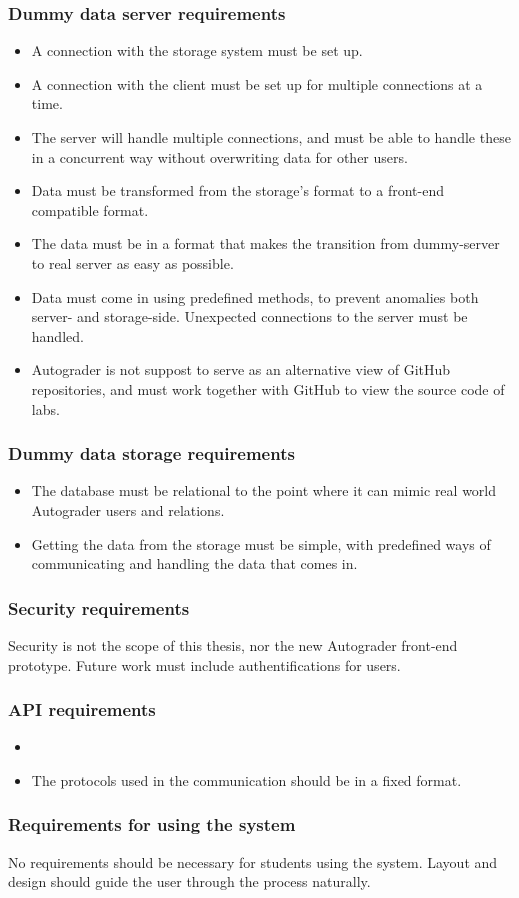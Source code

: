 \subsubsection{Dummy data server requirements}
\begin{itemize}
\item A connection with the storage system must be set up.
\item A connection with the client must be set up for multiple connections at a time.
\item The server will handle multiple connections, and must be able to handle these in a concurrent way without overwriting data for other users.
\item Data must be transformed from the storage's format to a front-end compatible format.
\item The data must be in a format that makes the transition from dummy-server to real server as easy as possible.
\item Data must come in using predefined methods, to prevent anomalies both server- and storage-side. Unexpected connections to the server must be handled.
\item Autograder is not suppost to serve as an alternative view of GitHub repositories, and must work together with GitHub to view the source code of labs.
\end{itemize}

\subsubsection{Dummy data storage requirements}
\begin{itemize}
\item The database must be relational to the point where it can mimic real world Autograder users and relations.
\item Getting the data from the storage must be simple, with predefined ways of communicating and handling the data that comes in.
\end{itemize}

\subsubsection{Security requirements}
Security is not the scope of this thesis, nor the new Autograder front-end prototype. Future work must include authentifications for users.

\subsubsection{API requirements}
\begin{itemize}
\item 
\item The protocols used in the communication should be in a fixed format.
\end{itemize}
\subsubsection{Requirements for using the system}
No requirements should be necessary for students using the system. Layout and design should guide the user through the process naturally.
